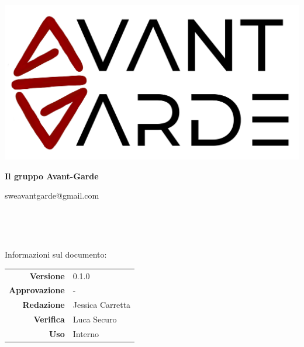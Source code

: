     \begin{titlepage}
        \begin{center}
            \includegraphics[width=\textwidth]{logo+scritta.png}

            \vspace{0.5cm}
            {\huge \textbf{Il gruppo Avant-Garde}}

            \vspace{0.4cm}
            \large{sweavantgarde@gmail.com}

            \vspace{1.5cm}
            \hrulefill\\
            \vspace{0.2cm}
            
            \textbf{\titoloDocumento}\\
           
            \hrulefill

            \vfill
            Informazioni sul documento:\\
            \vspace{0.3cm}
                \begin{tabular}{ r | l }
                    \textbf{Versione} & 0.1.0\\ %
                    \textbf{Approvazione} & -\\ %
                    \textbf{Redazione} & Jessica Carretta\\ %
                    \textbf{Verifica} & Luca Securo\\ %
                    \textbf{Uso} & Interno\\ %
                \end{tabular}
        \end{center}
    \end{titlepage}
\restoregeometry